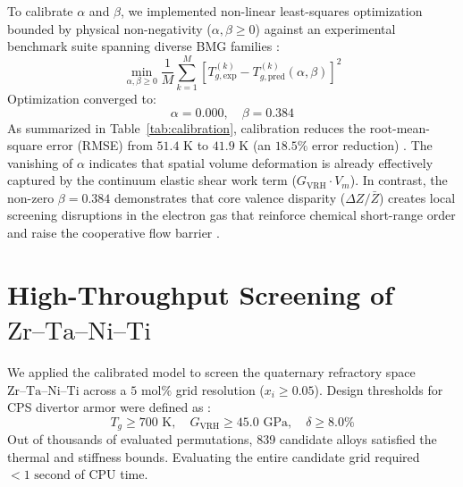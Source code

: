\documentclass[aps,prmaterials,reprint,superscriptaddress,amsmath,amssymb,floatfix]{revtex4-2}
\begin{document}
To calibrate $\alpha$ and $\beta$, we implemented non-linear least-squares optimization bounded by physical non-negativity ($\alpha, \beta \ge 0$) against an experimental benchmark suite spanning diverse BMG families \cite{Wang2004BMG,Inoue2000Acta,Nishiyama2002PdNiP,Wilde2000PdNiP,Inoue1989AlNiLa,YeLu2005AlNiLa,Zhang2007TiBMG,Zhu2008TiCPS,Luborsky1983,Davis1978Metglas}:
\begin{equation}
\min_{\alpha, \beta \ge 0} \frac{1}{M} \sum_{k=1}^M \left[ T_{g,\text{exp}}^{(k)} - T_{g,\text{pred}}^{(k)}(\alpha, \beta) \right]^2
\label{eq:loss}
\end{equation}
Optimization converged to:
\begin{equation}
\alpha = 0.000, \quad \beta = 0.384
\label{eq:calibrated_params}
\end{equation}
As summarized in Table~\ref{tab:calibration}, calibration reduces the root-mean-square error (RMSE) from $51.4\text{ K}$ to $41.9\text{ K}$ (an $18.5\%$ error reduction) \cite{Zhu1997LBFGS,Virtanen2020SciPy}. The vanishing of $\alpha$ indicates that spatial volume deformation is already effectively captured by the continuum elastic shear work term ($G_{\text{VRH}} \cdot V_m$). In contrast, the non-zero $\beta = 0.384$ demonstrates that core valence disparity ($\Delta Z / \bar{Z}$) creates local screening disruptions in the electron gas that reinforce chemical short-range order and raise the cooperative flow barrier \cite{Miedema1988,Johnson2005,Miracle2006}.

\section{High-Throughput Screening of $\text{Zr--Ta--Ni--Ti}$}

We applied the calibrated model to screen the quaternary refractory space $\text{Zr--Ta--Ni--Ti}$ across a $5\text{ mol}\%$ grid resolution ($x_i \ge 0.05$). Design thresholds for CPS divertor armor were defined as \cite{Egami1984,CPS_Review_2020,Johnson2005,Inoue2000Acta}:
\begin{equation}
T_g \ge 700\text{ K}, \quad G_{\text{VRH}} \ge 45.0\text{ GPa}, \quad \delta \ge 8.0\%
\end{equation}
Out of thousands of evaluated permutations, 839 candidate alloys satisfied the thermal and stiffness bounds. Evaluating the entire candidate grid required $<1\text{ second}$ of CPU time.
\end{document}
